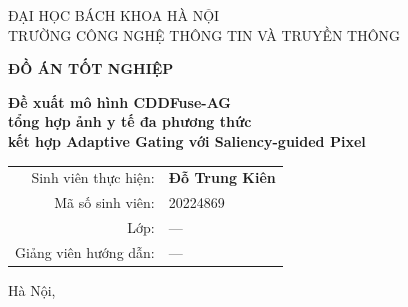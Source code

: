 \begin{titlepage}
\centering
{\large ĐẠI HỌC BÁCH KHOA HÀ NỘI\\
TRƯỜNG CÔNG NGHỆ THÔNG TIN VÀ TRUYỀN THÔNG\par}
\vspace{2cm}
{\huge \textbf{ĐỒ ÁN TỐT NGHIỆP}\par}
\vspace{1.5cm}
{\LARGE \textbf{Đề xuất mô hình CDDFuse-AG}\\[0.5em]
\textbf{tổng hợp ảnh y tế đa phương thức}\\[0.5em]
\textbf{kết hợp Adaptive Gating với Saliency-guided Pixel}\par}
\vspace{3cm}

\begin{tabular}{rl}
Sinh viên thực hiện: & \textbf{Đỗ Trung Kiên} \\
Mã số sinh viên:    & 20224869 \\
Lớp:                & --- \\
Giảng viên hướng dẫn: & --- \\
\end{tabular}

\vfill
{\large Hà Nội, \the\year\par}
\end{titlepage}
